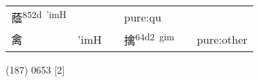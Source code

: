 \documentclass[14pt,a4paper]{scrartcl}
\begin{document}
\begin{longtable}[c]{@{}llllll@{}}
\begin{minipage}[t]{0.14\columnwidth}
蔭\textsuperscript{852d~'imH}
\strut\end{minipage} &
\begin{minipage}[t]{0.14\columnwidth}\raggedright\strut
\strut\end{minipage} &
\begin{minipage}[t]{0.14\columnwidth}\raggedright\strut
\strut\end{minipage} &
\begin{minipage}[t]{0.14\columnwidth}\raggedright\strut
pure:qu
\strut\end{minipage}\tabularnewline
\begin{minipage}[t]{0.14\columnwidth}\raggedright\strut
禽
\strut\end{minipage} &
\begin{minipage}[t]{0.14\columnwidth}\raggedright\strut
'imH
\strut\end{minipage} &
\begin{minipage}[t]{0.14\columnwidth}\raggedright\strut
\strut\end{minipage} &
\begin{minipage}[t]{0.14\columnwidth}\raggedright\strut
擒\textsuperscript{64d2~gim}
\strut\end{minipage} &
\begin{minipage}[t]{0.14\columnwidth}\raggedright\strut
\strut\end{minipage} &
\begin{minipage}[t]{0.14\columnwidth}\raggedright\strut
pure:other
\strut\end{minipage}\tabularnewline
\bottomrule
\end{longtable}

(187) 0653 {[}2{]}
\end{document}
